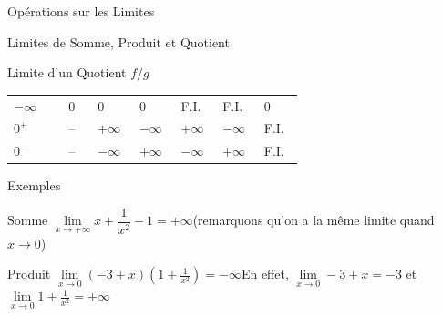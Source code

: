 \documentclass{coursbook}
\begin{document}
\begin{Gpartie}{Opérations sur les Limites}
\begin{Spartie}{Limites de Somme, Produit et Quotient}
\begin{SSpartie}{Limite d'un Quotient $f/g$}
\begin{table}[H]
\begin{tabular}{ p{0.15\linewidth} *{6}{M{0.08\linewidth}} }
                        $-\infty$ & $0$ & $0$ & $0$ & F.I. & F.I. & $0$ \\
                        $0^+$ & -- & $+\infty$ & $-\infty$ & $+\infty$ & $-\infty$ & F.I. \\
                        $0^-$ & -- & $-\infty$ & $+\infty$ & $-\infty$ & $+\infty$ & F.I. \\ \bottomrule
                    \end{tabular}
                \end{table}
            \end{SSpartie}
            \begin{SSpartie}{Exemples} 
                \begin{SSSpartie}{Somme} 
                    $\lim\limits_{x\to+\infty}x+\dfrac{1}{x^2}-1=+\infty$\quad(remarquons qu'on a la même limite quand $x\to0$)
                \end{SSSpartie}
                \begin{SSSpartie}{Produit} 
                    $\lim\limits_{x\to0}\left(-3+x\right)\left(1+\frac{1}{x^2}\right)=-\infty$\qquad En effet, $\lim\limits_{x\to0}-3+x=-3$ et $\lim\limits_{x\to0}1+\frac{1}{x^2}=+\infty$
    

\end{SSSpartie}
\end{SSpartie}
\end{Spartie}
\end{Gpartie}
\end{document}
